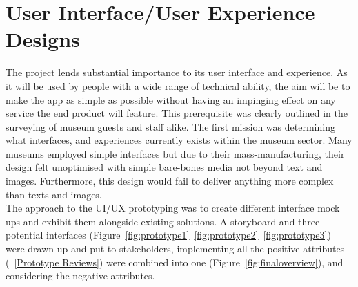 \section{User Interface/User Experience Designs}
The project lends substantial importance to its user interface and experience. As it will be used by people with a wide range of technical ability, the aim will be to make the app as simple as possible without having an impinging effect on any service the end product will feature. This prerequisite was clearly outlined in the surveying of museum guests and staff alike. The first mission was determining what interfaces, and experiences currently exists within the museum sector. Many museums employed simple interfaces but due to their mass-manufacturing, their design felt unoptimised with simple bare-bones media not beyond text and images. Furthermore, this design would fail to deliver anything more complex than texts and images.\\
  
The approach to the UI/UX prototyping was to create different interface mock ups and exhibit them alongside existing solutions. A storyboard and three potential interfaces (Figure~\ref{fig:prototype1}~\ref{fig:prototype2}~\ref{fig:prototype3}) were drawn up and put to stakeholders, implementing all the positive attributes (~\ref{Prototype Reviews}) were combined into one (Figure~\ref{fig:finaloverview}), and considering the negative attributes.

